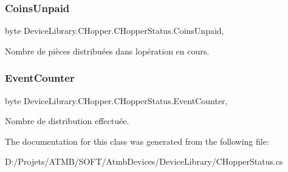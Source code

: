 \subsubsection{\texorpdfstring{Coins\+Unpaid}{CoinsUnpaid}}
{\footnotesize\ttfamily byte Device\+Library.\+C\+Hopper.\+C\+Hopper\+Status.\+Coins\+Unpaid\hspace{0.3cm}{\ttfamily [get]}, {\ttfamily [set]}}



Nombre de pièces distribuées dans l\textquotesingle{}opération en cours. 

\mbox{\label{class_device_library_1_1_c_hopper_1_1_c_hopper_status_ac1a6a71f2f93c75586758b64294f0576}} 
\subsubsection{\texorpdfstring{Event\+Counter}{EventCounter}}
{\footnotesize\ttfamily byte Device\+Library.\+C\+Hopper.\+C\+Hopper\+Status.\+Event\+Counter\hspace{0.3cm}{\ttfamily [get]}, {\ttfamily [set]}}



Nombre de distribution effectuée. 



The documentation for this class was generated from the following file\+:\begin{DoxyCompactItemize}
\item 
D\+:/\+Projets/\+A\+T\+M\+B/\+S\+O\+F\+T/\+Atmb\+Devices/\+Device\+Library/C\+Hopper\+Status.\+cs\end{DoxyCompactItemize}

